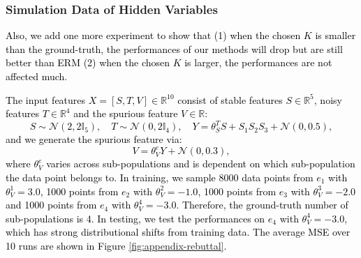 %

\subsubsection{Simulation Data of Hidden Variables}
\quad\textcolor{black}{Also, we add one more experiment to show that (1) when the chosen $K$ is smaller than the ground-truth, the performances of our methods will drop but are still better than ERM (2) when the chosen $K$ is larger, the performances are not affected much.}

\textcolor{black}{The input features $X=[S,T,V]\in\mathbb{R}^{10}$ consist of stable features $S\in\mathbb{R}^5$, noisy features $T\in\mathbb{R}^4$ and the spurious feature $V\in\mathbb R$:
$$
S\sim \mathcal{N}(2,2\mathbb I_5),\quad  T\sim \mathcal{N}(0, 2\mathbb I_4), \quad Y=\theta_S^TS + S_1S_2S_3+\mathcal{N}(0,0.5),
$$
and we generate the spurious feature via:
$$
V = \theta_V^e Y + \mathcal{N}(0, 0.3),
$$
where $\theta_V^e$ varies across sub-populations and is dependent on which sub-population the data point belongs to.
In training, we sample 8000 data points from $e_1$ with $\theta_V^1=3.0$, 1000 points from $e_2$ with $\theta_V^2=-1.0$, 1000 points from $e_3$ with $\theta_V^3=-2.0$ and 1000 points from $e_4$ with $\theta_V^4=-3.0$.
Therefore, the ground-truth number of sub-populations is 4.
In testing, we test the performances on $e_4$ with $\theta_V^4=-3.0$, which has strong distributional shifts from training data.
The average MSE over 10 runs are shown in Figure \ref{fig:appendix-rebuttal}.}


